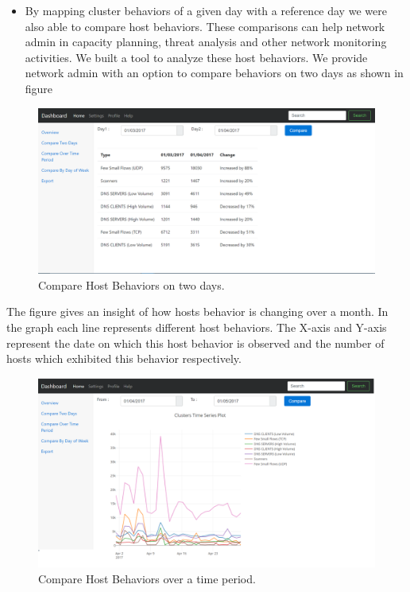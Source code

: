 \begin{itemize}
\item  By mapping cluster behaviors of a given day with a reference day we were also able
to compare host behaviors. These comparisons can help network admin in capacity
planning, threat analysis and other network monitoring activities. We built a tool to analyze these host behaviors. 
We provide network admin with an option to compare
behaviors on two days as shown in figure 


\end{itemize}

\begin{figure}[ht]
	\centerline{\includegraphics[scale = 0.45]{tool_compare_days.png}}
	\caption{Compare Host Behaviors on two days.}%
\end{figure} 

The figure  gives an insight of how hosts behavior is changing over a month.
In the graph each line represents different host behaviors. The X-axis and Y-axis
represent the date on which this host behavior is observed and the number of hosts
which exhibited this behavior respectively.

\begin{figure}[ht]
	\centerline{\includegraphics[scale = 0.45]{tool_compare_week.png}}
	\caption{Compare Host Behaviors over a time period.}%
\end{figure} 



